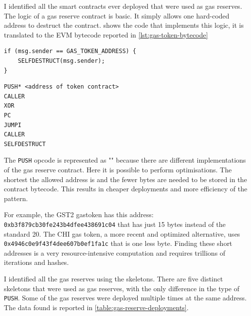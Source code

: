 I identified all the smart contracts ever deployed that were used as gas reserves. The logic of a gas reserve contract is basic. It simply allows one hard-coded address to destruct the contract. 
 shows the code that implements this logic, it is translated to the EVM bytecode reported in \cref{lst:gas-token-bytecode}

\begin{lstlisting}[caption={Pseudo code of the gas reserves.},label={lst:gas-token-code},captionpos=b,numbers=none]
if (msg.sender == GAS_TOKEN_ADDRESS) {
    SELFDESTRUCT(msg.sender);
}
\end{lstlisting}

\begin{lstlisting}[caption={EVM bytecode of the gas reserves.},label={lst:gas-token-bytecode},captionpos=b,numbers=none]
PUSH* <address of token contract>
CALLER
XOR
PC
JUMPI
CALLER
SELFDESTRUCT
\end{lstlisting}

The {\tt PUSH} opcode is represented as "{\tt *}" because there are different implementations of the gas reserve contract. Here it is possible to perform optimisations. The shortest the allowed address is and the fewer bytes are needed to be stored in the contract bytecode. This results in cheaper deployments and more efficiency of the pattern.

For example, the GST2 gastoken has this address: \\{\tt 0xb3f879cb30fe243b4dfee438691c04} that has just 15 bytes instead of the standard 20. The CHI gas token, a more recent and optimized alternative, uses\\ {\tt 0x4946c0e9f43f4dee607b0ef1fa1c} that is one less byte. Finding these short addresses is a very resource-intensive computation and requires trillions of iterations and hashes.

I identified all the gas reserves using the skeletons. There are five distinct skeletons that were used as gas reserves, with the only difference in the type of {\tt PUSH}. Some of the gas reserves were deployed multiple times at the same address. The data found is reported in \cref{table:gas-reserve-deployments}.

